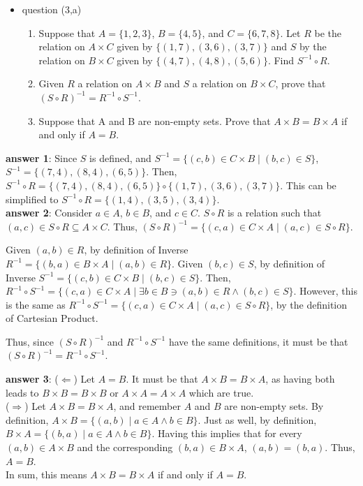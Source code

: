 \documentclass[12pt]{article}
\newcommand\sube{\subseteq}
\begin{document}
\begin{itemize}
\item question (3,a)
\begin{enumerate}
\item Suppose that \(A=\{1,2,3\}\), \(B=\{4,5\}\), and \(C=\{6,7,8\}\). Let \(R\) be the
relation on \(A\times{}C\) given by \(\{(1,7),(3,6),(3,7)\}\) and \(S\) by the relation
on \(B\times{}C\) given by \(\{(4,7),(4,8),(5,6)\}\). Find \(S^{-1}\circ{}R\).
\item Given \(R\) a relation on \(A\times{}B\) and \(S\) a relation on \(B\times{}C\), prove that
\((S\circ{}R)^{-1}=R^{-1}\circ{}S^{-1}\).
\item Suppose that A and B are non-empty sets. Prove that \(A\times{}B=B\times{}A\) if and only
if \(A=B\).
\end{enumerate}
\end{itemize}
\textbf{answer 1}: Since \(S\) is defined, and \(S^{-1}=\{(c,b)\in{}C\times{}B\mid{}(b,c)\in{}S\}\),
\(S^{-1}=\{(7,4),(8,4),(6,5)\}\). Then,
\(S^{-1}\circ{}R=\{(7,4),(8,4),(6,5)\}\circ\{(1,7),(3,6),(3,7)\}\). This can be
simplified to \(S^{-1}\circ{}R=\{(1,4),(3,5),(3,4)\}\). \\
\textbf{answer 2}: Consider \(a\in{}A\), \(b\in{}B\), and \(c\in{}C\). \(S\circ{}R\) is a relation such that
\((a,c)\in{}S\circ{}R\sube{}A\times{}C\). Thus, \((S\circ{}R)^{-1}=\{(c,a)\in{}C\times{}A\mid{}(a,c)\in{}S\circ{}R\}\).

Given \((a,b)\in{}R\), by definition of Inverse \(R^{-1}=\{(b,a)\in{}B\times{}A\mid{}(a,b)\in{}R\}\).
Given \((b,c)\in{}S\), by definition of Inverse \(S^{-1}=\{(c,b)\in{}C\times{}B\mid{}(b,c)\in{}S\}\).
Then,
\(R^{-1}\circ{}S^{-1}=\{(c,a)\in{}C\times{}A\mid{}\exists{}b\in{}B\ni{}(a,b)\in{}R\land{}(b,c)\in{}S\}\).
However, this is the same as
\(R^{-1}\circ{}S^{-1}=\{(c,a)\in{}C\times{}A\mid{}(a,c)\in{}S\circ{}R\}\), by the
definition of Cartesian Product.

Thus, since \((S\circ{}R)^{-1}\) and \(R^{-1}\circ{}S^{-1}\) have the same definitions, it must be
that \((S\circ{}R)^{-1}=R^{-1}\circ{}S^{-1}\).

\textbf{answer 3}: (\(\Leftarrow\)) Let \(A=B\). It must be that \(A\times{}B=B\times{}A\), as having both leads to
\(B\times{}B=B\times{}B\) or \(A\times{}A=A\times{}A\) which are true. \\
(\(\Rightarrow\)) Let \(A\times{}B=B\times{}A\), and remember \(A\) and \(B\) are non-empty sets. By definition,
\(A\times{}B=\{(a,b)\mid{}a\in{}A\land{}b\in{}B\}\). Just as well, by definition,
\(B\times{}A=\{(b,a)\mid{}a\in{}A\land{}b\in{}B\}\). Having this implies that for every \((a,b)\in{}A\times{}B\) and
the corresponding \((b,a)\in{}B\times{}A\), \((a,b)=(b,a)\). Thus, \(A=B\). \\
In sum, this means \(A\times{}B=B\times{}A\) if and only if \(A=B\).
\end{document}
